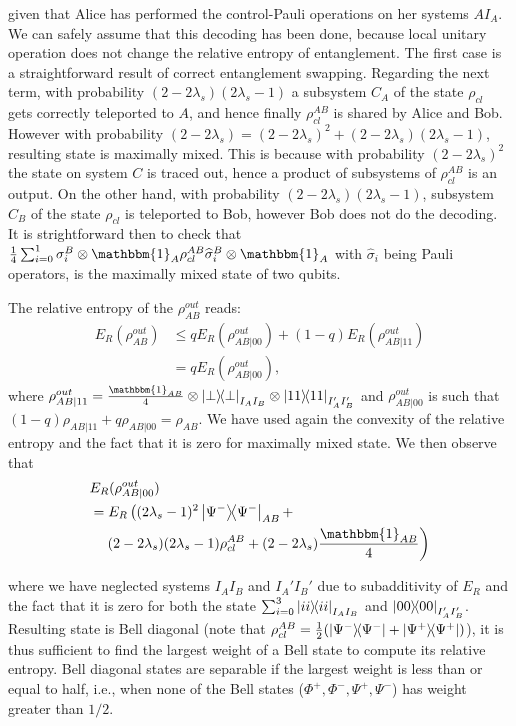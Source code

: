 \documentclass[aps,pra,twocolumn,superscriptaddress,longbibliography]{revtex4-1}
\newcommand{\bbm}[1]{\mathbbm{#1}}
\begin{document}
\begin{appendix}
given that Alice has performed the control-Pauli operations on her systems $AI_A$. We can safely assume that this decoding has been done, because local unitary operation does not change the relative entropy of entanglement. The first case is a straightforward result of correct entanglement swapping. Regarding the next term, with probability $(2-2\lambda_s)(2\lambda_s-1)$ a subsystem $C_A$ of the state $\rho_{cl}$ gets correctly teleported to $A$, and hence finally $\rho_{cl}^{AB}$ is shared by Alice and Bob. However with probability $(2-2\lambda_s)=(2-2\lambda_s)^2 +(2-2\lambda_s)(2\lambda_s-1)$, resulting state is maximally mixed. This is because with probability $(2-2\lambda_s)^2$ the state on system $C$ is traced out, hence a product of subsystems of $\rho_{cl}^{AB}$  is an output. On the other hand, with probability $(2-2\lambda_s)(2\lambda_s-1)$, subsystem $C_B$ of the state  $\rho_{cl}$ is teleported to Bob, however Bob does not do the decoding. It is strightforward then to check that ${1\over 4}\sum_{i=0}^1 \sigma_i^{B}\otimes\bbm{1}_A\rho_{cl}^{AB}\widehat{\sigma}_i^B\otimes \bbm{1}_A$ with $\widehat{\sigma}_i$ being Pauli operators, is the maximally mixed state of two qubits.

The relative entropy of the $\rho_{AB}^{out}$ reads:
\begin{align}
E_R(\rho^{out}_{AB}) & \leq q E_R(\rho_{AB|00}^{out}) + (1-q)E_R(\rho_{AB|11}^{out})\\ 
& =  q E_R(\rho^{out}_{AB|00}),
\label{eq:qbound2}
\end{align}
where $\rho_{AB|11}^{out} = {\bbm{1}_{AB}\over 4}\otimes \op{\perp}_{I_AI_B}\otimes \op{11}_{I'_AI'_B}$ and $\rho_{AB|00}^{out}$ is such that
$(1-q)\rho_{AB|11}+q\rho_{AB|00} = \rho_{AB}$. We have used again the convexity of the relative entropy and the fact that it is zero for 
maximally mixed state. We then observe that 
\begin{align}
& E_R(\rho_{AB|00}^{out})  \nonumber\\
 &=  E_R\left({(2\lambda_s-1)^2}\op{\Psi^-}_{AB}  + \right. \nonumber\\ 
&\quad \left. (2-2\lambda_s)(2\lambda_s-1) \rho_{cl}^{AB} + 
(2-2\lambda_s) {\bbm{1}_{AB}\over 4}\right)
\end{align}

where we have neglected systems $I_AI_B$ and $I_A'I_B'$ due to subadditivity of $E_R$ and the fact that it is zero for both the state $\sum_{i=0}^{3}\op{ii}_{I_AI_B}$ and $\op{00}_{I_A'I_B'}$.
Resulting state is Bell diagonal (note that $\rho_{cl}^{AB} = {1\over 2}(\op{\Psi^-}+\op{\Psi^+})$), it is thus sufficient to find the largest weight of a Bell state to compute its relative entropy. Bell diagonal states are separable if the largest weight is less than or equal to half, i.e., when none of the Bell states ($\Phi^+,\Phi^-,\Psi^+,\Psi^-$) has weight greater than $1/2$.


\end{appendix}
\end{document}
